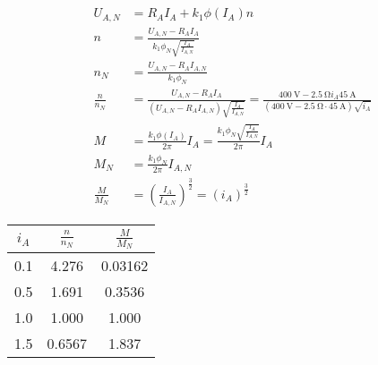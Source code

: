 \documentclass[11pt,a4paper]{scrartcl}
\newcommand{\mybr}[1]{\left(#1\right)}
\newcommand{\0}{_{\mybr{0}}}
\newcommand{\1}{_{\mybr{1}}}
\newcommand{\2}{_{\mybr{2}}}
\begin{document}
\section{}
\subsection{}
\begin{align}
U_{A,N}&=R_A I_A+k_1\phi\mybr{I_A}n\\
n&=\frac{U_{A,N}-R_A I_A}{k_1\phi_N\sqrt{\frac{I_A}{I_{A,N}}}}\\
n_N&=\frac{U_{A,N}-R_A I_{A,N}}{k_1\phi_N}\\
\frac{n}{n_N}&=\frac{U_{A,N}-R_A I_A}{\mybr{U_{A,N}-R_A I_{A,N}}\sqrt{\frac{I_A}{I_{A,N}}}}=\frac{\SI{400}{\volt}-\SI{2.5}{\ohm}i_A\SI{45}{\ampere}}{\mybr{\SI{400}{\volt}-\SI{2.5}{\ohm}\cdot\SI{45}{\ampere}}\sqrt{i_A}}\\
M&=\frac{k_1\phi\mybr{I_A}}{2\pi}I_A=\frac{k_1\phi_N\sqrt{\frac{I_A}{I_{A,N}}}}{2\pi}I_A\\
M_N&=\frac{k_1\phi_N}{2\pi}I_{A,N}\\
\frac{M}{M_N}&=\mybr{\frac{I_A}{I_{A,N}}}^{\frac{3}{2}}=\mybr{i_A}^{\frac{3}{2}}
\end{align}
\begin{table}[htbp]
	\begin{center}
	\begin{tabular}{SSS}
		\toprule
		{$i_A$} & {$\frac{n}{n_N}$} & {$\frac{M}{M_N}$} \\
		 & 4.276 & 0.03162 \\
		0.5 & 1.691 & 0.3536 \\
		1.0 & 1.000 & 1.000 \\
		1.5 & 0.6567 & 1.837 \\
		\bottomrule
	\end{tabular}
	\end{center}
\end{table}
\begin{figure*}[!hp]
\centering
{}
\end{figure*}
\end{document}
